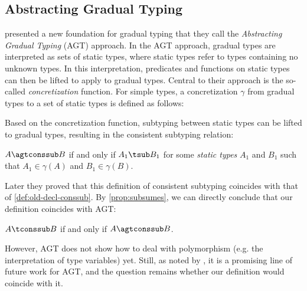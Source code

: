 \subsection{Abstracting Gradual Typing}
\label{subsec:agt}

\citet{garcia2016abstracting} presented a new foundation for gradual typing that
they call the \emph{Abstracting Gradual Typing} (AGT) approach. In the AGT
approach, gradual types are interpreted as sets of static types, where static
types refer to types containing no unknown types. In this interpretation,
predicates and functions on static types can then be lifted to apply to gradual
types. Central to their approach is the so-called \emph{concretization}
function. For simple types, a concretization $\gamma$ from gradual types to a
set of static types is defined as follows:

\begin{definition}[Concretization]
  \label{def:concret}
\end{definition}

Based on the concretization function, subtyping between static types can be
lifted to gradual types, resulting in the consistent subtyping relation:
\begin{definition}
  \label{def:agt-conssub}
  $A \agtconssub B$ if and only if $A_1 \tsub B_1$ for some \emph{static types} $A_1$ and $B_1$ such that
   $A_1 \in \gamma(A)$ and $B_1 \in \gamma(B)$.
\end{definition}

Later they proved that this definition of consistent subtyping coincides with
that of \cref{def:old-decl-conssub}. By
\cref{prop:subsumes}, we can directly conclude that our definition coincides with AGT:

\begin{corollary}
  \label{lemma:coincide-agt}
  $A \tconssub B$ if and only if $A \agtconssub B$.
\end{corollary}

However, AGT does not show how to deal with polymorphism (e.g. the
interpretation of type variables) yet.
Still, as noted by \citet{garcia2016abstracting},
it is a promising line of future work for
AGT, and the question remains whether our definition would coincide with it.

